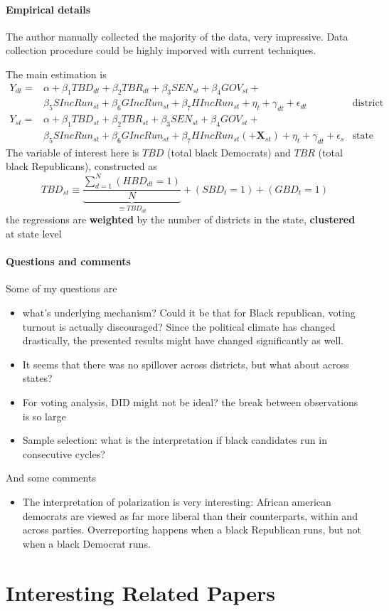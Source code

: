 \documentclass[twoside]{article}
\theoremstyle{definition}
\begin{document}
\paragraph*{Empirical details} The author manually collected the majority of the data, very impressive. Data collection procedure could be highly imporved with current techniques.

The main estimation is 
$$
\begin{aligned}
Y_{dt}= & \alpha+\beta_{1}TBD_{dt}+\beta_{2}TBR_{dt}+\beta_{3}SEN_{st}+\beta_{4}GOV_{st}+\\
& \beta_{5}SIncRun_{st}+\beta_{6}GIncRun_{st}+\beta_{7}HIncRun_{st}+\eta_{t}+\gamma_{dt}+\epsilon_{dt} & \text{district officials}\\
Y_{st}= & \alpha+\beta_{1}TBD_{st}+\beta_{2}TBR_{st}+\beta_{3}SEN_{st}+\beta_{4}GOV_{st}+\\
& \beta_{5}SIncRun_{st}+\beta_{6}GIncRun_{st}+\beta_{7}HIncRun_{st} \left(+\mathbf{X}_{st}\right) +\eta_{t}+\gamma_{dt}+\epsilon_{s} & \text{state officials}
\end{aligned}
$$
The variable of interest here is $TBD$ (total black Democrats) and $TBR$ (total black Republicans), constructed as 
$$
TBD_{st}\equiv \underbrace{\frac{\sum_{d=1}^{N}\left(HBD_{dt}=1\right)}{N}}_{\equiv TBD_{dt}}+\left(SBD_t=1\right)+\left(GBD_t=1\right)
$$
the regressions are \textbf{weighted} by the number of districts in the state, \textbf{clustered} at state level

\paragraph*{Questions and comments} Some of my questions are 
\begin{itemize}
    \item what's underlying mechanism? Could it be that for Black republican, voting turnout is actually discouraged? Since the political climate has changed drastically, the presented results might have changed significantly as well.
    \item It seems that there was no spillover across districts, but what about across states?
    \item For voting analysis, DID might not be ideal? the break between observations is so large
    \item Sample selection: what is the interpretation if black candidates run in consecutive cycles?
\end{itemize}
And some comments
\begin{itemize}
    \item The interpretation of polarization is very interesting: African american democrats are viewed as far more liberal than their counterparts, within and across parties. Overreporting happens when a black Republican runs, but not when a black Democrat runs.
\end{itemize}

\section{Interesting Related Papers}



\newpage


\end{document}
